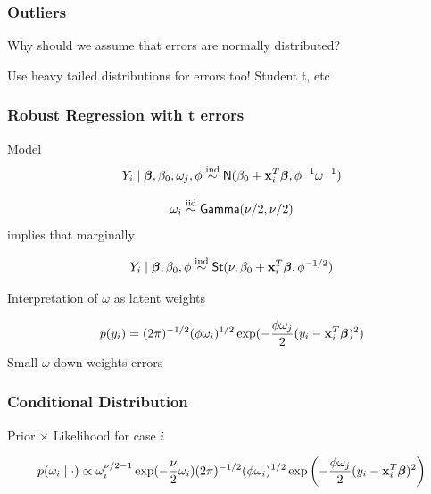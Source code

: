 \documentclass{beamer}\usepackage[]{graphicx}\usepackage[]{color}
\makeatletter
\newcommand{\hlcom}[1]{\textcolor[rgb]{0.678,0.584,0.686}{\textit{#1}}}%
\newenvironment{kframe}{%
 \def\at@end@of@kframe{}%
 \ifinner\ifhmode%
  \def\at@end@of@kframe{\end{minipage}}%
  \begin{minipage}{\columnwidth}%
 \fi\fi%
 \def\FrameCommand##1{\hskip\@totalleftmargin \hskip-\fboxsep
 \colorbox{shadecolor}{##1}\hskip-\fboxsep
     \hskip-\linewidth \hskip-\@totalleftmargin \hskip\columnwidth}%
 \MakeFramed {\advance\hsize-\width
   \@totalleftmargin\z@ \linewidth\hsize
   \@setminipage}}%
 {\par\unskip\endMakeFramed%
 \at@end@of@kframe}
\newenvironment{knitrout}{}{} %
\makeatother
\begin{document}
\begin{frame}\frametitle{Outliers}

Why should we assume that errors are normally distributed?  \pause

\vspace{2.75in}



Use heavy tailed distributions for errors too!  Student t, etc

\end{frame}

\begin{frame} \frametitle{Robust Regression with t errors}
Model
$$ Y_i \mid \boldsymbol{\beta}, \beta_0, \omega_j, \phi \mathrel{\mathop{\sim}\limits^{\rm ind}}
\textsf{N}(\beta_0 + \mathbf{x}_i^T\boldsymbol{\beta}, \phi^{-1} \omega^{-1})$$
 \pause

$$
\omega_i \mathrel{\mathop{\sim}\limits^{\rm iid}} \textsf{Gamma}(\nu/2, \nu/2)
$$
 \pause
implies that marginally

$$ Y_i \mid \boldsymbol{\beta}, \beta_0, \phi
\mathrel{\mathop{\sim}\limits^{\rm ind}} \textsf{St}(\nu, \beta_0 + \mathbf{x}_i^T\boldsymbol{\beta}, \phi^{-1/2})
$$
 \pause

Interpretation of $\omega$ as latent weights

$$p(y_i) =  (2 \pi)^{-1/2} (\phi \omega_i)^{1/2}
\exp( - \frac{\phi \omega_j}{2}(y_i - \mathbf{x}_i^T \boldsymbol{\beta})^2)
$$
 \pause
Small $\omega$ down weights errors
\end{frame}

\begin{frame} \frametitle{Conditional Distribution}
Prior $\times$ Likelihood for case $i$

$$p(\omega_i \mid \cdot) \propto \omega_i^{\nu/2 - 1} \exp(- \frac{\nu}{2} \omega_i)  (2 \pi)^{-1/2} (\phi \omega_i)^{1/2}
\exp\left( - \frac{\phi \omega_j}{2}(y_i - \mathbf{x}_i^T \boldsymbol{\beta})^2\right)$$

\vspace{2.5in}

\end{frame}

\end{document}

